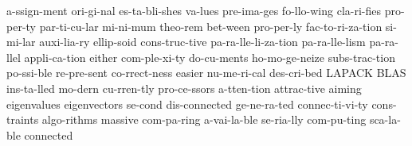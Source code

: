 \hyphenation
{
a-ssign-ment
ori-gi-nal 
es-ta-bli-shes 
va-lues 
pre-ima-ges 
fo-llo-wing
cla-ri-fies
pro-per-ty
par-ti-cu-lar
mi-ni-mum
theo-rem
bet-ween
pro-per-ly
fac-to-ri-za-tion
si-mi-lar
auxi-lia-ry
ellip-soid
cons-truc-tive
pa-ra-lle-li-za-tion
pa-ra-lle-lism
pa-ra-llel
appli-ca-tion
either
com-ple-xi-ty
do-cu-ments
ho-mo-ge-neize
subs-trac-tion
po-ssi-ble
re-pre-sent
co-rrect-ness
easier
nu-me-ri-cal
des-cri-bed
LAPACK
BLAS
ins-ta-lled
mo-dern
cu-rren-tly
pro-ce-ssors
a-tten-tion
attrac-tive
aiming
eigenvalues
eigenvectors
se-cond
dis-connected
ge-ne-ra-ted
connec-ti-vi-ty
cons-traints
algo-rithms
massive
com-pa-ring
a-vai-la-ble
se-ria-lly
com-pu-ting
sca-la-ble
connected
}
